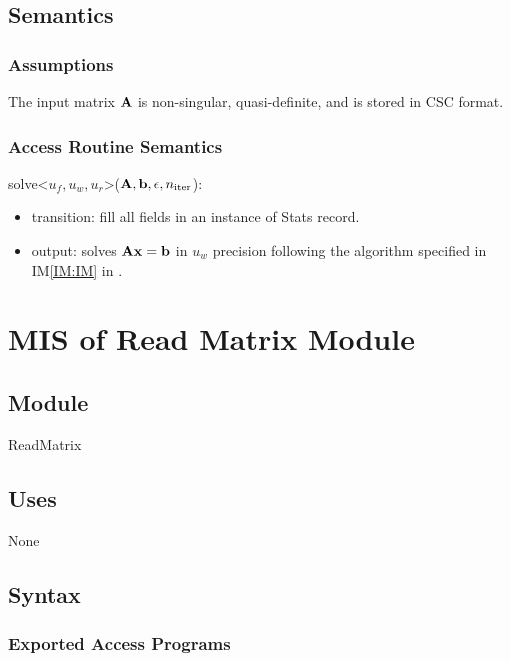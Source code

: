 \documentclass[12pt, titlepage]{article}
\newcommand{\iref}[1]{IM\ref{#1}}
\begin{document}
\subsection{Semantics}

\subsubsection{Assumptions}

The input matrix \(\mathbf{A}\) is non-singular, quasi-definite, and is stored in
CSC format.

\subsubsection{Access Routine Semantics}

\noindent solve<\(u_f, u_w, u_r\)>(\(\mathbf{A}, \mathbf{b}, \epsilon, n_\mathrm{iter}\)):
\begin{itemize}
\item transition: fill all fields in an instance of Stats record.
\item output: solves \(\mathbf{A}\mathbf{x} = \mathbf{b} \) in \(u_w\) precision following the algorithm
  specified in \iref{IM:IM} in \cite{SRS}.
\end{itemize}

\newpage

\section{MIS of Read Matrix Module} \label{M:input}

\subsection{Module}

ReadMatrix

\subsection{Uses}

None

\subsection{Syntax}

\subsubsection{Exported Access Programs}
\end{document}
